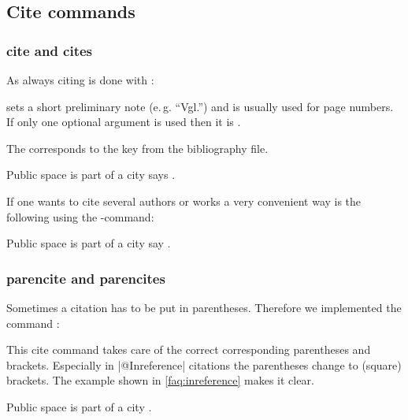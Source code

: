 \documentclass[a4paper,
10pt,
greek,
french,
spanish,
italian,
ngerman,
english,
]{ltxdoc}
\begin{document}
\subsection{Cite commands}
\label{cite-commands}
\subsubsection{cite and cites}
\DescribeMacro{\cite}
As always citing is done with :

 sets a short preliminary note (e.\,g. \enquote{Vgl.}) and  is usually used for page numbers.
If only one optional argument is used then it is .
The  corresponds to the key from the bibliography file.

\begin{example}
Public space is part of a city says \cite{Osland2016}.
\end{example}

\DescribeMacro{\cites}
If one wants to cite several authors or works a very convenient way is the following using the -command:
\begin{example}
Public space is part of a city say \cites(cf.)(){Osland2016}{Evangelidis2014}.
\end{example}
 
 \subsubsection{parencite and parencites}
\DescribeMacro{\parencite}
Sometimes a citation has to be put in parentheses. 
Therefore we implemented the command :
This cite command takes care of the correct corresponding parentheses and brackets.
Especially in |@Inreference| citations the parentheses  change to (square) brackets.
The example shown in \cref{faq:inreference} makes it clear.
\begin{example}
Public space is part of a city \parencite{Osland2016}.
\end{example}
\end{document}
